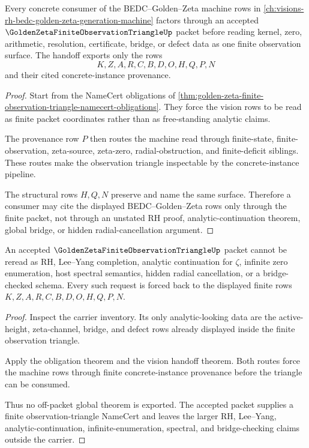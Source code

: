\begin{theorem}
\label{thm:golden-zeta-finite-observation-triangle-vision-handoff}
Every concrete consumer of the BEDC--Golden--Zeta machine rows in \autoref{ch:visions-rh-bedc-golden-zeta-generation-machine} factors through an accepted $\GoldenZetaFiniteObservationTriangleUp$ packet before reading kernel, zero, arithmetic, resolution, certificate, bridge, or defect data as one finite observation surface. The handoff exports only the rows
$$
K,Z,A,R,C,B,D,O,H,Q,P,N
$$
and their cited concrete-instance provenance.
\end{theorem}
\begin{proof}
Start from the NameCert obligations of \autoref{thm:golden-zeta-finite-observation-triangle-namecert-obligations}. They force the vision rows to be read as finite packet coordinates rather than as free-standing analytic claims.

The provenance row $P$ then routes the machine read through finite-state, finite-observation, zeta-source, zeta-zero, radial-obstruction, and finite-deficit siblings. These routes make the observation triangle inspectable by the concrete-instance pipeline.

The structural rows $H,Q,N$ preserve and name the same surface. Therefore a consumer may cite the displayed BEDC--Golden--Zeta rows only through the finite packet, not through an unstated RH proof, analytic-continuation theorem, global bridge, or hidden radial-cancellation argument.
\end{proof}

\begin{theorem}
\label{thm:golden-zeta-finite-observation-triangle-nonescape}
An accepted $\GoldenZetaFiniteObservationTriangleUp$ packet cannot be reread as RH, Lee--Yang completion, analytic continuation for $\zeta$, infinite zero enumeration, host spectral semantics, hidden radial cancellation, or a bridge-checked schema. Every such request is forced back to the displayed finite rows $K,Z,A,R,C,B,D,O,H,Q,P,N$.
\end{theorem}
\begin{proof}
Inspect the carrier inventory. Its only analytic-looking data are the active-height, zeta-channel, bridge, and defect rows already displayed inside the finite observation triangle.

Apply the obligation theorem and the vision handoff theorem. Both routes force the machine rows through finite concrete-instance provenance before the triangle can be consumed.

Thus no off-packet global theorem is exported. The accepted packet supplies a finite observation-triangle NameCert and leaves the larger RH, Lee--Yang, analytic-continuation, infinite-enumeration, spectral, and bridge-checking claims outside the carrier.
\end{proof}

